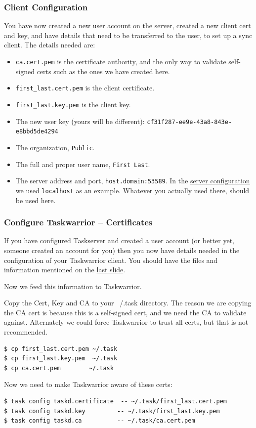 \documentclass[t,handout]{beamer}
\begin{document}
\begin{frame}[fragile]\frametitle{Client Configuration}\label{clientconfiguration}
    \vfill
    You have now created a new user account on the server, created a new client cert and key, and have details that need to be transferred to the user, to set up a sync client.  The details needed are:

    \begin{itemize}
        \item \verb+ca.cert.pem+ is the certificate authority, and the only way to validate self-signed certs such as the ones we have created here.
        \item \verb+first_last.cert.pem+ is the client certificate.
        \item \verb+first_last.key.pem+ is the client key.
        \item The new user key (yours will be different): \verb+cf31f287-ee9e-43a8-843e-e8bbd5de4294+
        \item The organization, \verb+Public+.
        \item The full and proper user name, \verb+First Last+.
        \item The server address and port, \verb+host.domain:53589+. In the \hyperlink{serverconfiguration}{server configuration} we used \verb+localhost+ as an example. Whatever you actually used there, should be used here.
  \end{itemize}
\end{frame}

\begin{frame}[fragile]\frametitle{Configure Taskwarrior -- Certificates}
    \vfill
    If you have configured Taskserver and created a user account (or better yet, someone created an account for you) then you now have details needed in the configuration of your Taskwarrior client. You should have the files and information mentioned on the \hyperlink{clientconfiguration}{last slide}.

    Now we feed this information to Taskwarrior.

    Copy the Cert, Key and CA to your ~/.task directory.  The reason we are copying the CA cert is because this is a self-signed cert, and we need the CA to validate against.  Alternately we could force Taskwarrior to trust all certs, but that is not recommended.

    \begin{lstlisting}
$ cp first_last.cert.pem ~/.task
$ cp first_last.key.pem  ~/.task
$ cp ca.cert.pem        ~/.task\end{lstlisting}

    Now we need to make Taskwarrior aware of these certs:

    \begin{lstlisting}
$ task config taskd.certificate  -- ~/.task/first_last.cert.pem
$ task config taskd.key         -- ~/.task/first_last.key.pem
$ task config taskd.ca          -- ~/.task/ca.cert.pem\end{lstlisting}
\end{frame}
\end{document}
